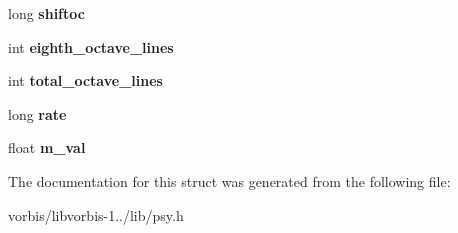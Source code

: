 \begin{DoxyCompactItemize}
\item 
\hypertarget{structvorbis__look__psy_a97ab9b72727138cef93f0b930bc47568}{long {\bfseries shiftoc}}\label{structvorbis__look__psy_a97ab9b72727138cef93f0b930bc47568}

\item 
\hypertarget{structvorbis__look__psy_afc52eca23e371be299e975dbedb16340}{int {\bfseries eighth\+\_\+octave\+\_\+lines}}\label{structvorbis__look__psy_afc52eca23e371be299e975dbedb16340}

\item 
\hypertarget{structvorbis__look__psy_adf9a21c963c42ef1ccc000ab4127af09}{int {\bfseries total\+\_\+octave\+\_\+lines}}\label{structvorbis__look__psy_adf9a21c963c42ef1ccc000ab4127af09}

\item 
\hypertarget{structvorbis__look__psy_ab670c918ba2eea41e7dfed9d3ac33294}{long {\bfseries rate}}\label{structvorbis__look__psy_ab670c918ba2eea41e7dfed9d3ac33294}

\item 
\hypertarget{structvorbis__look__psy_aacbda1e90ed61475b1d1c6d81adc0cbb}{float {\bfseries m\+\_\+val}}\label{structvorbis__look__psy_aacbda1e90ed61475b1d1c6d81adc0cbb}

\end{DoxyCompactItemize}


The documentation for this struct was generated from the following file\+:\begin{DoxyCompactItemize}
\item 
vorbis/libvorbis-\/1../lib/psy.\+h\end{DoxyCompactItemize}
